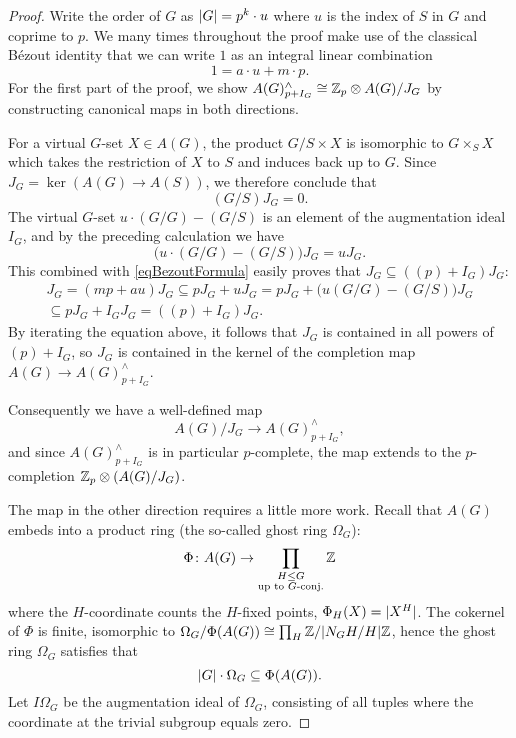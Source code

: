 \documentclass[10pt]{amsart}
\theoremstyle{definition}
\DeclarePairedDelimiter{\abs}{\lvert}{\rvert}
\begin{document}
\begin{proof}
Write the order of $G$ as $\abs{G}=p^k\cdot u$ where $u$ is the index of $S$ in $G$ and coprime to $p$.
We many times throughout the proof make use of the classical B{\'e}zout identity that we can write $1$ as an integral linear combination
\begin{equation}\label{eqBezoutFormula}
1 = a\cdot u + m\cdot p.
\end{equation}
For the first part of the proof, we show $A(G)^{\wedge}_{p+I_G} \cong \mathbb{Z}_p \otimes A(G)/J_G$ by constructing canonical maps in both directions.

For a virtual $G$-set $X\in A(G)$, the product $G/S \times X$ is isomorphic to $G\times_S X$ which takes the restriction of $X$ to $S$ and induces back up to $G$. Since $J_G=\ker(A(G)\xrightarrow{} A(S))$, we therefore conclude that
\[(G/S) J_G = 0.\]
The virtual $G$-set $u\cdot(G/G) - (G/S)$ is an element of the augmentation ideal $I_G$, and by the preceding calculation we have
\[\bigl(u\cdot(G/G) - (G/S) \bigr) J_G = u J_G.\]
This combined with \eqref{eqBezoutFormula} easily proves that $J_G\subseteq ((p)+I_G)J_G$:
\begin{multline*}
J_G = (mp+au)J_G \subseteq pJ_G+ uJ_G = pJ_G + \bigl(u(G/G) - (G/S)\bigr)J_G \\\subseteq pJ_G + I_GJ_G = ((p)+I_G)J_G.
\end{multline*}
By iterating the equation above, it follows that $J_G$ is contained in all powers of $(p)+I_G$, so $J_G$ is contained in the kernel of the completion map $A(G)\to A(G)^\wedge_{p+I_G}$.

Consequently we have a well-defined map
\[A(G)/J_G \to A(G)^\wedge_{p+I_G},\]
and since $A(G)^\wedge_{p+I_G}$ is in particular $p$-complete, the map extends to the $p$-completion $\mathbb{Z}_p\otimes (A(G)/J_G)$.

The map in the other direction requires a little more work. Recall that $A(G)$ embeds into a product ring (the so-called ghost ring $\Omega_G$):
\[
\Phi\colon A(G) \to \prod_{\substack{H\leq G \\ \text{up to $G$-conj.}}} \mathbb{Z}
\]
where the $H$-coordinate counts the $H$-fixed points, $\Phi_H(X) = \abs{X^H}$. The cokernel of $\Phi$ is finite, isomorphic to $\Omega_G/\Phi(A(G)) \cong \prod_H \Z/\abs{N_G H / H}\Z$, hence the ghost ring $\Omega_G$ satisfies that
\[\abs{G}\cdot \Omega_G \subseteq \Phi(A(G)).\]
Let $I\Omega_G$ be the augmentation ideal of $\Omega_G$, consisting of all tuples where the coordinate at the trivial subgroup equals zero.


\end{proof}
\end{document}

